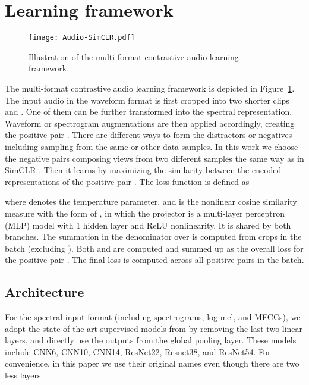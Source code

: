 \documentclass{article}
\begin{document}
\section{Learning framework}

\begin{figure}[t]
  \centering
  \texttt{[image: Audio-SimCLR.pdf]}
  \caption{Illustration of the multi-format contrastive audio learning framework.}
  \label{fig:framework}
\end{figure}

The multi-format contrastive audio learning framework is depicted in Figure~\ref{fig:framework}. The input audio in the waveform format is first cropped into two shorter clips  and . One of them can be further transformed into the spectral representation. Waveform or spectrogram augmentations are then applied accordingly, creating the positive pair . There are different ways to form the distractors or negatives including sampling from the same or other data samples. In this work we choose the negative pairs composing views from two different samples the same way as in SimCLR \cite{chen2020simple}. Then it learns by maximizing the similarity between the encoded representations of the positive pair . The loss function is defined as



where  denotes the temperature parameter, and  is the nonlinear cosine similarity measure with the form of , in which the projector  is a multi-layer perceptron (MLP) model with 1 hidden layer and ReLU nonlinearity. It is shared by both branches.
The summation in the denominator over  is computed from  crops in the batch (excluding ).
Both  and  are computed and summed up as the overall loss for the positive pair . The final loss is computed across all positive pairs in the batch.

\subsection{Architecture}

For the spectral input format (including spectrograms, log-mel, and MFCCs), we adopt the state-of-the-art supervised models from \cite{kong2020panns} by removing the last two linear layers, and directly use the outputs from the global pooling layer. These models include CNN6, CNN10, CNN14, ResNet22, Resnet38, and ResNet54. For convenience, in this paper we use their original names even though there are two less layers.
\end{document}
